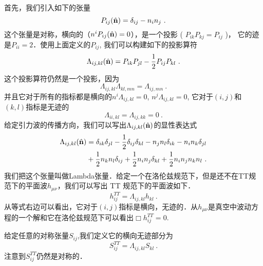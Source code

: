 首先，我们引入如下的张量
\begin{equation}
P_{ij} (\hat{\bf{n}} ) = \delta_{ij} - n_in_j~.
\end{equation}
这个张量是对称，横向的（$ n^iP_{ij}(\hat{\bf{n}}) = 0 $），是一个投影 ( $ P_{ik} P_{kj} = P_{ij} $ )， 它的迹是$P_{ii} = 2$．使用上面定义的$P_{ij}$, 我们可以构建如下的投影算符
\begin{equation}
\Lambda_{ij,kl} ( \hat{\bf{n}} )  = P_{ik} P_{jl} - \frac{1}{2} P_{ij} P_{kl} ~. 
\end{equation}
这个投影算符仍然是一个投影，因为
\begin{equation}
\Lambda_{ij,kl} \Lambda_{kl,mn} = \Lambda_{ij,mn} ~. 
\end{equation}
并且它对于所有的指标都是横向的$ n^i \Lambda_{ij,kl} = 0 $, $ n^j \Lambda_{ij,kl} = 0 $, 它对于$(i,j)$和$(k,l)$指标是无迹的
\begin{equation}
\Lambda_{ii,kl} = \Lambda_{ij,kk} = 0 ~. 
\end{equation}
给定引力波的传播方向，我们可以写出$\Lambda_{ij,kl} (\hat{ {\bf n} })$的显性表达式
\begin{equation}
\begin{aligned}
\Lambda_{ij,kl} (\hat{ {\bf n} }   ) & = \delta_{ik} \delta_{jl} - \frac{1}{2} \delta_{ij} \delta_{kl} - n_j n_l \delta_{ik} - n_i n_k \delta_{jl} \\
& + \frac{1}{2} n_k n_l \delta_{ij} + \frac{1}{2} n_i n_j \delta_{kl} + \frac{1}{2} n_i n_j n_k n_l ~.
\end{aligned}
\end{equation}
我们把这个张量叫做Lambda张量．给定一个在洛伦兹规范下，但是还不在TT规范下的平面波$h_{\mu\nu}$，我们可以写出 TT 规范下的平面波如下．
\begin{equation}
h_{ij}^{TT} = \Lambda_{ij,kl} h_{kl} ~.
\end{equation}
从等式右边可以看出，它对于$(i,j)$指标是横向，无迹的．从$h_{\mu\nu}$是真空中波动方程的一个解和它在洛伦兹规范下可以看出$\Box h_{ij}^{TT} = 0$. 

给定任意的对称张量$S_{ij}$,我们定义它的横向无迹部分为
\begin{equation}
S^{TT}_{ij} = \Lambda_{ij,kl} S_{kl} ~.
\end{equation}
注意到$S^{TT}_{ij}$仍然是对称的．

